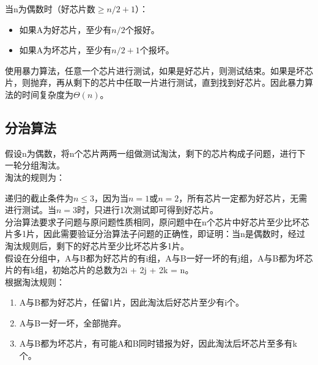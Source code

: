 当n为偶数时（好芯片数$ \ge n/2 + 1 $）：

\begin{itemize}
    \item 如果A为好芯片，至少有$ n / 2 $个报好。
    \item 如果A为坏芯片，至少有$ n/2 + 1 $个报坏。
\end{itemize}

使用暴力算法，任意一个芯片进行测试，如果是好芯片，则测试结束。如果是坏芯片，则抛弃，再从剩下的芯片中任取一片进行测试，直到找到好芯片。因此暴力算法的时间复杂度为$ \Theta(n) $。

\subsection{分治算法}

假设n为偶数，将n个芯片两两一组做测试淘汰，剩下的芯片构成子问题，进行下一轮分组淘汰。 \\

淘汰的规则为：

\begin{table}[H]
    \centering
    \caption{淘汰规则}
\end{table}

递归的截止条件为$ n \le 3 $，因为当$ n = 1 $或$ n = 2 $，所有芯片一定都为好芯片，无需进行测试。当$ n = 3 $时，只进行1次测试即可得到好芯片。 \\

分治算法要求子问题与原问题性质相同，原问题中在n个芯片中好芯片至少比坏芯片多1片，因此需要验证分治算法子问题的正确性，即证明：当n是偶数时，经过淘汰规则后，剩下的好芯片至少比坏芯片多1片。 \\

假设在分组中，A与B都为好芯片的有i组，A与B一好一坏的有j组，A与B都为坏芯片的有k组，初始芯片的总数为2i + 2j + 2k = n。 \\

根据淘汰规则：

\begin{enumerate}
    \item A与B都为好芯片，任留1片，因此淘汰后好芯片至少有i个。
    \item A与B一好一坏，全部抛弃。
    \item A与B都为坏芯片，有可能A和B同时错报为好，因此淘汰后坏芯片至多有k个。
\end{enumerate}

